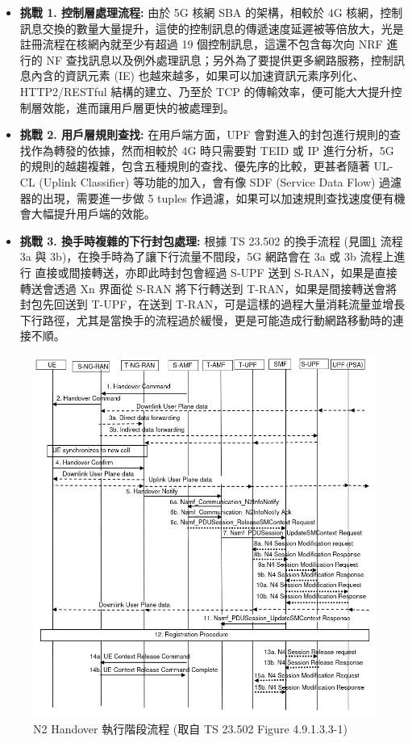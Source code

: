 \begin{itemize}
\item \textbf{挑戰 1. 控制層處理流程:} 由於 5G 核網 SBA 的架構，相較於 4G 核網，控制訊息交換的數量大量提升，這使的控制訊息的傳遞速度延遲被等倍放大，光是註冊流程在核網內就至少有超過 19 個控制訊息，這還不包含每次向 NRF 進行的 NF 查找訊息以及例外處理訊息；另外為了要提供更多網路服務，控制訊息內含的資訊元素 (IE) 也越來越多，如果可以加速資訊元素序列化、HTTP2/RESTful 結構的建立、乃至於 TCP 的傳輸效率，便可能大大提升控制層效能，進而讓用戶層更快的被處理到。
\item \textbf{挑戰 2. 用戶層規則查找:} 在用戶端方面，UPF 會對進入的封包進行規則的查找作為轉發的依據，然而相較於 4G 時只需要對 TEID 或 IP 進行分析，5G 的規則的越趨複雜，包含五種規則的查找、優先序的比較，更甚者隨著 UL-CL (Uplink Classifier) 等功能的加入，會有像 SDF (Service Data Flow) 過濾器的出現，需要進一步做 5 tuples 作過濾，如果可以加速規則查找速度便有機會大幅提升用戶端的效能。
\item \textbf{挑戰 3. 換手時複雜的下行封包處理:} 根據 TS 23.502 的換手流程 (見圖\ref{fig:n2_hand_exec_proc} 流程 3a 與 3b)，在換手時為了讓下行流量不間段，5G 網路會在 3a 或 3b 流程上進行 直接或間接轉送，亦即此時封包會經過 S-UPF 送到 S-RAN，如果是直接轉送會透過 Xn 界面從 S-RAN 將下行轉送到 T-RAN，如果是間接轉送會將封包先回送到 T-UPF，在送到 T-RAN，可是這樣的過程大量消耗流量並增長下行路徑，尤其是當換手的流程過於緩慢，更是可能造成行動網路移動時的連接不順。
\end{itemize}

\begin{figure}[htbp]
    \centering
    \includegraphics[height=!,width=0.9\linewidth,keepaspectratio=true]{figures/23_502_4_9_1_3_3-1_N2_handover_exec.png}
    \caption[N2 Handover 執行階段流程]{{\footnotesize N2 Handover 執行階段流程 (取自 TS 23.502 Figure 4.9.1.3.3-1\cite{3gpp.23.502})}}
    \label{fig:n2_hand_exec_proc}
\end{figure}


